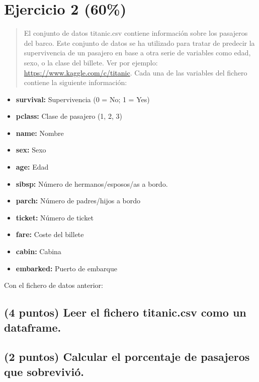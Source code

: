 \documentclass[]{article}
\providecommand{\tightlist}{%
  \setlength{\itemsep}{0pt}\setlength{\parskip}{0pt}}
\begin{document}
\section{Ejercicio 2 (60\%)}\label{ejercicio-2-60}

\begin{quote}
El conjunto de datos titanic.csv contiene información sobre los
pasajeros del barco. Este conjunto de datos se ha utilizado para tratar
de predecir la supervivencia de un pasajero en base a otra serie de
variables como edad, sexo, o la clase del billete. Ver por ejemplo:
\url{https://www.kaggle.com/c/titanic}. Cada una de las variables del
fichero contiene la siguiente información:
\end{quote}

\begin{itemize}
\tightlist
\item
  \textbf{survival:} Supervivencia (0 = No; 1 = Yes)
\item
  \textbf{pclass:} Clase de pasajero (1, 2, 3)
\item
  \textbf{name:} Nombre
\item
  \textbf{sex:} Sexo
\item
  \textbf{age:} Edad
\item
  \textbf{sibsp:} Número de hermanos/esposos/as a bordo.
\item
  \textbf{parch:} Número de padres/hijos a bordo
\item
  \textbf{ticket:} Número de ticket
\item
  \textbf{fare:} Coste del billete
\item
  \textbf{cabin:} Cabina
\item
  \textbf{embarked:} Puerto de embarque
\end{itemize}

Con el fichero de datos anterior:

\subsection{\texorpdfstring{(4 puntos) Leer el fichero
\textbf{titanic.csv} como un
dataframe.}{(4 puntos) Leer el fichero titanic.csv como un dataframe.}}\label{puntos-leer-el-fichero-titanic.csv-como-un-dataframe.}

\subsection{(2 puntos) Calcular el porcentaje de pasajeros que
sobrevivió.}\label{puntos-calcular-el-porcentaje-de-pasajeros-que-sobrevivio.}
\end{document}
